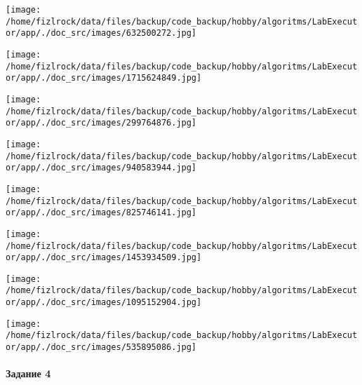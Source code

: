 \documentclass[a4paper, 12pt]{article}
\begin{document}
\texttt{[image: /home/fizlrock/data/files/backup/code\_backup/hobby/algoritms/LabExecutor/app/./doc\_src/images/632500272.jpg]}

\texttt{[image: /home/fizlrock/data/files/backup/code\_backup/hobby/algoritms/LabExecutor/app/./doc\_src/images/1715624849.jpg]}

\texttt{[image: /home/fizlrock/data/files/backup/code\_backup/hobby/algoritms/LabExecutor/app/./doc\_src/images/299764876.jpg]}

\texttt{[image: /home/fizlrock/data/files/backup/code\_backup/hobby/algoritms/LabExecutor/app/./doc\_src/images/940583944.jpg]}

\texttt{[image: /home/fizlrock/data/files/backup/code\_backup/hobby/algoritms/LabExecutor/app/./doc\_src/images/825746141.jpg]}

\texttt{[image: /home/fizlrock/data/files/backup/code\_backup/hobby/algoritms/LabExecutor/app/./doc\_src/images/1453934509.jpg]}

\texttt{[image: /home/fizlrock/data/files/backup/code\_backup/hobby/algoritms/LabExecutor/app/./doc\_src/images/1095152904.jpg]}

\texttt{[image: /home/fizlrock/data/files/backup/code\_backup/hobby/algoritms/LabExecutor/app/./doc\_src/images/535895086.jpg]}
\pagebreak
\paragraph{Задание 4}
\end{document}

